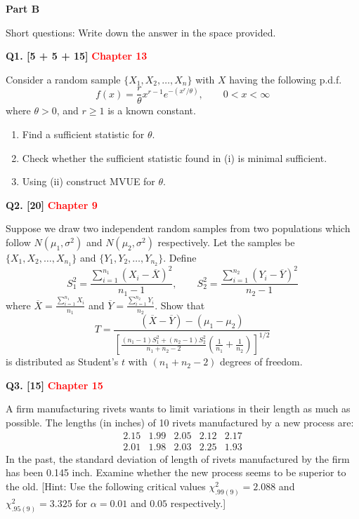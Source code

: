 \documentclass[11pt]{article}
\begin{document}
\clearpage

\begin{center}
\textbf{Part B}
\end{center}

Short questions: Write down the answer in the space provided.

\medskip
\textbf{Q1. [5 + 5 + 15]}  \textbf{\textcolor{red}{Chapter 13}}

Consider a random sample $\{X_1,X_2,\ldots,X_n\}$ with $X$ having the following p.d.f.
\[
f(x)=\frac{r}{\theta}x^{r-1}e^{-\left(x^r/\theta\right)},\qquad 0<x<\infty
\]
where $\theta>0$, and $r\geq 1$ is a known constant.
\begin{enumerate}
\setlength{\itemsep}{3pt}\setlength{\parsep}{0pt}\setlength{\topsep}{3pt}
\item[(i)] Find a sufficient statistic for $\theta$.
\item[(ii)] Check whether the sufficient statistic found in (i) is minimal sufficient.
\item[(iii)] Using (ii) construct MVUE for $\theta$.
\end{enumerate}

\bigskip
\textbf{Q2. [20]}  \textbf{\textcolor{red}{Chapter 9}}

Suppose we draw two independent random samples from two populations which follow $N(\mu_1,\sigma^2)$ and $N(\mu_2,\sigma^2)$ respectively. Let the samples be $\{X_1,X_2,\ldots,X_{n_1}\}$ and $\{Y_1,Y_2,\ldots,Y_{n_2}\}$. Define
\[
S_1^2=\frac{\sum_{i=1}^{n_1}(X_i-\overline{X})^2}{n_1-1},\qquad
S_2^2=\frac{\sum_{i=1}^{n_2}(Y_i-\overline{Y})^2}{n_2-1}
\]
where $\overline{X}=\frac{\sum_{i=1}^{n_1}X_i}{n_1}$ and $\overline{Y}=\frac{\sum_{i=1}^{n_2}Y_i}{n_2}$. Show that
\[
T=\frac{(\overline{X}-\overline{Y})-(\mu_1-\mu_2)}
{\left[\frac{(n_1-1)S_1^2+(n_2-1)S_2^2}{n_1+n_2-2}
\left(\frac{1}{n_1}+\frac{1}{n_2}\right)\right]^{1/2}}
\]
is distributed as Student's $t$ with $(n_1+n_2-2)$ degrees of freedom.

\bigskip
\textbf{Q3. [15]}  \textbf{\textcolor{red}{Chapter 15}}

A firm manufacturing rivets wants to limit variations in their length as much as possible. The lengths (in inches) of 10 rivets manufactured by a new process are:
\[
\begin{array}{ccccc}
2.15 & 1.99 & 2.05 & 2.12 & 2.17\\
2.01 & 1.98 & 2.03 & 2.25 & 1.93
\end{array}
\]
In the past, the standard deviation of length of rivets manufactured by the firm has been 0.145 inch. Examine whether the new process seems to be superior to the old. [Hint: Use the following critical values $\chi^2_{.99(9)}=2.088$ and $\chi^2_{.95(9)}=3.325$ for $\alpha=0.01$ and $0.05$ respectively.]
\end{document}
